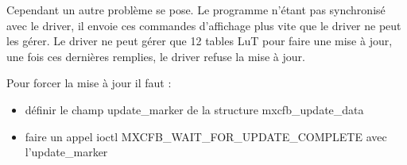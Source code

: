 Cependant un autre problème se pose. Le programme n'étant pas synchronisé avec le driver, il envoie ces commandes d'affichage plus vite que le driver ne peut les gérer.
Le driver ne peut gérer que 12 tables LuT pour faire une mise à jour, une fois ces dernières remplies, le driver refuse la mise à jour.

Pour forcer la mise à jour il faut :
\begin{itemize}
	\item définir le champ update_marker de la structure mxcfb_update_data
	\item faire un appel ioctl MXCFB_WAIT_FOR_UPDATE_COMPLETE avec l'update_marker
\end{itemize}
